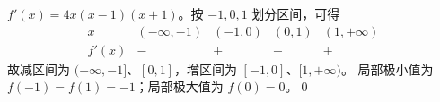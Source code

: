 $f'(x)=4x(x-1)(x+1)$。按 $-1,0,1$ 划分区间，可得
\[
\begin{array}{c|cccc}
x&(-\infty,-1)&(-1,0)&(0,1)&(1,+\infty)\\\hline
f'(x)&-&+&-&+
\end{array}
\]
故减区间为 $(-\infty,-1]$、$[0,1]$，增区间为 $[-1,0]$、$[1,+\infty)$。
局部极小值为 $f(-1)=f(1)=-1$；局部极大值为 $f(0)=0$。\qed
